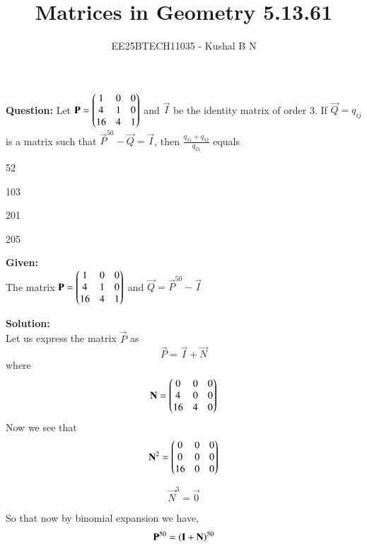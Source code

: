 \documentclass[journal,12pt,onecolumn]{IEEEtran}
\title{Matrices in Geometry 5.13.61}
\author{EE25BTECH11035 - Kushal B N}
\theoremstyle{remark}
\begin{document}
\vspace{3cm}
\maketitle
{\let\newpage\relax\maketitle}
\textbf{Question: }
Let $\mathbf{P} = \begin{pmatrix}1&0&0\\4&1&0\\16&4&1\end{pmatrix}$ and $\vec{I}$ be the identity matrix of order 3. If $\vec{Q} = q_{ij}$ is a matrix such that $\vec{P}^{50} - \vec{Q} = \vec{I}$, then $\frac{q_{31}+q_{32}}{q_{21}}$ equals
\hfill{}

\begin{enumerate}
\begin{multicols}{4}
    \item 52
    \item 103
    \item 201
    \item 205
\end{multicols}
\end{enumerate}

\textbf{Given: } \\
The matrix $\mathbf{P} = \begin{pmatrix}1&0&0\\4&1&0\\16&4&1\end{pmatrix}$ and $\vec{Q} = \vec{P}^{50} - \vec{I}$

\textbf{Solution: }\\
Let us express the matrix $\vec{P}$ as\\
\begin{equation}
    \vec{P} = \vec{I} + \vec{N}
\end{equation}
where 
\begin{equation}
    \mathbf{N} = \begin{pmatrix}0&0&0\\4&0&0\\16&4&0\end{pmatrix}
\end{equation}
Now we see that 
\begin{equation}
    \mathbf{N}^2 = \begin{pmatrix}0&0&0\\0&0&0\\16&0&0\end{pmatrix}
\end{equation}

\begin{equation}
    \vec{N}^3 = \vec{0}
\end{equation}

So that now by binomial expansion we have,
\begin{equation}
    \mathbf{P}^{50} = \left(\mathbf{I}+\mathbf{N}\right)^{50} 
\end{equation}
\end{document}
